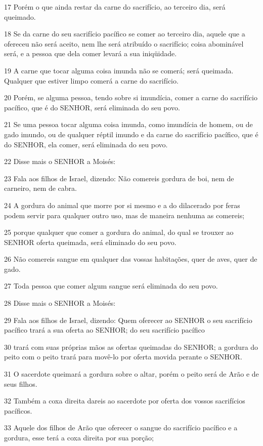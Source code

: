 \par 17 Porém o que ainda restar da carne do sacrifício, ao terceiro dia, será queimado.
\par 18 Se da carne do seu sacrifício pacífico se comer ao terceiro dia, aquele que a ofereceu não será aceito, nem lhe será atribuído o sacrifício; coisa abominável será, e a pessoa que dela comer levará a sua iniqüidade.
\par 19 A carne que tocar alguma coisa imunda não se comerá; será queimada. Qualquer que estiver limpo comerá a carne do sacrifício.
\par 20 Porém, se alguma pessoa, tendo sobre si imundícia, comer a carne do sacrifício pacífico, que é do SENHOR, será eliminada do seu povo.
\par 21 Se uma pessoa tocar alguma coisa imunda, como imundícia de homem, ou de gado imundo, ou de qualquer réptil imundo e da carne do sacrifício pacífico, que é do SENHOR, ela comer, será eliminada do seu povo.
\par 22 Disse mais o SENHOR a Moisés:
\par 23 Fala aos filhos de Israel, dizendo: Não comereis gordura de boi, nem de carneiro, nem de cabra.
\par 24 A gordura do animal que morre por si mesmo e a do dilacerado por feras podem servir para qualquer outro uso, mas de maneira nenhuma as comereis;
\par 25 porque qualquer que comer a gordura do animal, do qual se trouxer ao SENHOR oferta queimada, será eliminado do seu povo.
\par 26 Não comereis sangue em qualquer das vossas habitações, quer de aves, quer de gado.
\par 27 Toda pessoa que comer algum sangue será eliminada do seu povo.
\par 28 Disse mais o SENHOR a Moisés:
\par 29 Fala aos filhos de Israel, dizendo: Quem oferecer ao SENHOR o seu sacrifício pacífico trará a sua oferta ao SENHOR; do seu sacrifício pacífico
\par 30 trará com suas próprias mãos as ofertas queimadas do SENHOR; a gordura do peito com o peito trará para movê-lo por oferta movida perante o SENHOR.
\par 31 O sacerdote queimará a gordura sobre o altar, porém o peito será de Arão e de seus filhos.
\par 32 Também a coxa direita dareis ao sacerdote por oferta dos vossos sacrifícios pacíficos.
\par 33 Aquele dos filhos de Arão que oferecer o sangue do sacrifício pacífico e a gordura, esse terá a coxa direita por sua porção;
